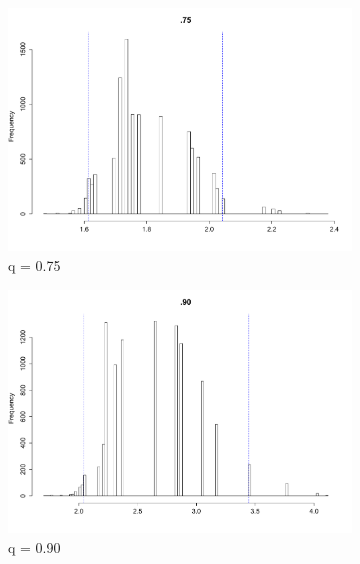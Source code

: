 \documentclass{article}
\renewcommand*{\(}{\left(}
\renewcommand*{\)}{\right)}
\begin{document}
\begin{figure}[H]
    \centering
    \begin{subfigure}[b]{0.3\textwidth}
        \includegraphics[width = \linewidth]{img/BootstrapNaif-75-100.pdf}
        \caption{q = 0.75}
        \label{fig:naifcB75}
    \end{subfigure}%
    \begin{subfigure}[b]{0.3\textwidth}
        \includegraphics[width = \linewidth]{img/BootstrapNaif-90-100.pdf}
        \caption{q = 0.90}
        \label{naifcB90}
    \end{subfigure}%
    \begin{subfigure}[b]{0.3\textwidth}

\end{subfigure}
\end{figure}
\end{document}
